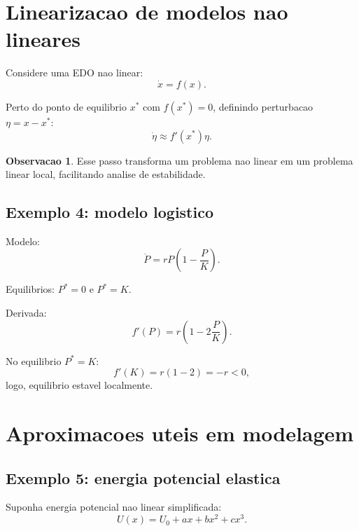 \documentclass[12pt,a4paper,oneside]{book}
\theoremstyle{definition}
\newtheorem{remark}[definition]{Observacao}
\begin{document}
\section{Linearizacao de modelos nao lineares}

Considere uma EDO nao linear:
\begin{equation}
\dot{x}=f(x).
\end{equation}

Perto do ponto de equilibrio $x^*$ com $f(x^*)=0$, definindo perturbacao $\eta=x-x^*$:
\begin{equation}
\dot{\eta} \approx f'(x^*)\eta.
\end{equation}

\begin{remark}
Esse passo transforma um problema nao linear em um problema linear local, facilitando analise de estabilidade.
\end{remark}

\subsection{Exemplo 4: modelo logistico}

Modelo:
\begin{equation}
\dot{P}=rP\left(1-\frac{P}{K}\right).
\end{equation}

Equilibrios: $P^*=0$ e $P^*=K$.

Derivada:
\begin{equation}
f'(P)=r\left(1-2\frac{P}{K}\right).
\end{equation}

No equilibrio $P^*=K$:
\begin{equation}
f'(K)=r(1-2)=-r<0,
\end{equation}
logo, equilibrio estavel localmente.

\section{Aproximacoes uteis em modelagem}

\subsection{Exemplo 5: energia potencial elastica}

Suponha energia potencial nao linear simplificada:
\begin{equation}
U(x)=U_0 + ax + bx^2 + cx^3.
\end{equation}
\end{document}
